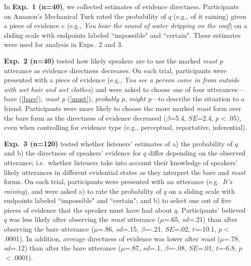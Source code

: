 \documentclass[11pt]{article}
\begin{document}
In \textbf{Exp.~1 (n=40)}, we collected estimates of evidence directness. Participants on Amazon's Mechanical Turk rated the probability of $q$ (e.g., of it raining) given a piece of evidence $e$ (e.g., \textit{You hear the sound of water dripping on the roof}) on a sliding scale with endpoints labeled ``impossible" and ``certain". These estimates were used for analysis in Exps.~2 and 3.

\textbf{Exp.~2 (n=40)} tested how likely speakers are to use the marked \emph{must p} utterance as evidence directness decreases. On each trial, participants were presented with a piece of evidence (e.g., \textit{You see a person come in from outside with wet hair and wet clothes}) and were asked to choose one of four utterances---bare (\ref{bare}), \textit{must p} (\ref{must}), \textit{probably p}, \textit{might p}---to describe the situation to a friend. Participants were more likely to choose the more marked \textit{must} form over the bare form as the directness of evidence decreased ($\beta$=5.4, $SE$=2.4, $p$$<$.05), even when controlling for evidence type (e.g., perceptual, reportative, inferential).

\textbf{Exp.~3 (n=120)} tested {whether listeners' estimates of a) the probability of $q$ and b) the directness of speakers' evidence for $q$ differ depending on the observed utterance}; i.e.~whether listeners take into account their knowledge of speakers' likely utterances in different evidential states as they interpret the bare and \textit{must} forms. On each trial, participants were presented with an utterance (e.g.~\textit{It's raining}), and were asked a) to rate the probability of $q$ on a sliding scale with endpoints labeled ``impossible" and ``certain"; and b) to select one out of five pieces of evidence that the speaker must have had about $q$. Participants' believed $q$ was less likely after observing the \textit{must} utterance ($\mu$=.65, $sd$=.21) than after observing the bare utterance ($\mu$=.86, $sd$=.15, $\beta$=-.21, $SE$=.02, $t$=-10.1, $p$$<$.0001). In addition, average directness of evidence was lower after \textit{must} ($\mu$=.78, $sd$=.12) than after the bare utterance ($\mu$=.87, $sd$=.1, $\beta$=-.08, $SE$=.01, $t$=-6.8, $p$$<$.0001).
\end{document}
